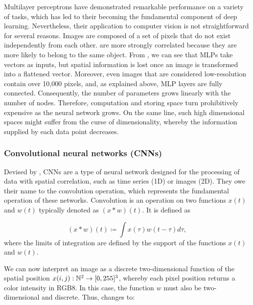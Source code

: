 Multilayer perceptrons have demonstrated remarkable performance on a variety of tasks, which has led to their becoming the fundamental component of deep learning. Nevertheless, their application to computer vision is not straightforward for several reasons. Images are composed of a set of pixels that do not exist independently from each other.  are more strongly correlated because they are more likely to belong to the same object. From , we can see that MLPs take vectors as inputs, but spatial information is lost once an image is transformed into a flattened vector. Moreover, even images that are considered low-resolution contain over 10,000 pixels, and, as explained above, MLP layers are fully connected. Consequently, the number of parameters grows linearly with the number of nodes. Therefore, computation and storing space turn prohibitively expensive as the neural network grows. On the same line, such high dimensional spaces might suffer from the curse of dimensionality, whereby the information supplied by each data point decreases.

\subsubsection{Convolutional neural networks (CNNs)} Devised by , CNNs are a type of neural network designed for the processing of data with spatial correlation, such as time series (1D) or images (2D). They owe their name to the convolution operation, which represents the fundamental operation of these networks. Convolution is an operation on two functions $x(t)$ and $w(t)$ typically denoted as $(x\ast w)(t)$. It is defined as

\begin{equation}
    (x\ast w)(t)\coloneqq \int x(\tau)w(t-\tau)d\tau,
    \label{eq:convolution}
\end{equation}
where the limits of integration are defined by the support of the functions $x(t)$ and $w(t)$. 

We can now interpret an image as a discrete two-dimensional function of the spatial position $x(i,j): \mathbb{N}^2\rightarrow [0, 255]^3$, whereby each pixel position returns a color intensity in RGB8. In this case, the function $w$ must also be two-dimensional and discrete. Thus,  changes to:


